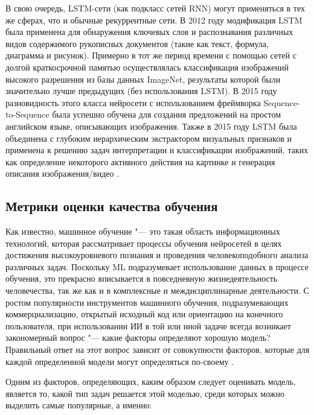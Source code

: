 \documentclass[bachelor, och, coursework]{SCWorks}
\begin{document}
        В свою очередь, LSTM-сети (как подкласс сетей RNN) могут применяться в
        тех же сферах, что и обычные рекуррентные сети. В 2012 году модификация
        LSTM была применена для обнаружения ключевых слов и распознавания
        различных видов содержимого рукописных документов (такие как текст,
        формула, диаграмма и рисунок). Примерно в тот же период времени с
        помощью сетей с долгой краткосрочной памятью осуществлялась
        классификация изображений высокого разрешения из базы данных ImageNet,
        результаты которой были значительно лучше предыдущих (без использования
        LSTM). В 2015 году разновидность этого класса нейросети с использованием
        фреймворка Sequence-to-Sequence была успешно обучена для создания
        предложений на простом английском языке, описывающих изображения. Также
        в 2015 году LSTM была объединена с глубоким иерархическим экстрактором
        визуальных признаков и применена к решению задач интерпретации и
        классификации изображений, таких как определение некоторого активного
        действия на картинке и генерация описания изображения/видео
        \cite{lstm2}.

    \subsection{Метрики оценки качества обучения}

        Как известно, машинное обучение "--- это такая область информационных
        технологий, которая рассматривает процессы обучения нейросетей в целях
        достижения высокоуровневого познания и проведения человекоподобного
        анализа различных задач. Поскольку ML подразумевает использование данных
        в процессе обучения, это прекрасно вписывается в повседневную
        жизнедеятельность человечества, так же как и в комплексные и
        междисциплинарные деятельности. С ростом популярности инструментов
        машинного обучения, подразумевающих коммерциализацию, открытый исходный
        код или ориентацию на конечного пользователя, при использовании ИИ в той
        или иной задаче всегда возникает закономерный вопрос "--- какие факторы
        определяют хорошую модель? Правильный ответ на этот вопрос зависит от
        совокупности факторов, которые для каждой определенной модели могут
        определяться по-своему \cite{metrics1}.

        Одним из факторов, определяющих, каким образом следует оценивать модель,
        является то, какой тип задач решается этой моделью, среди которых можно
        выделить самые популярные, а именно:
        
\end{document}
